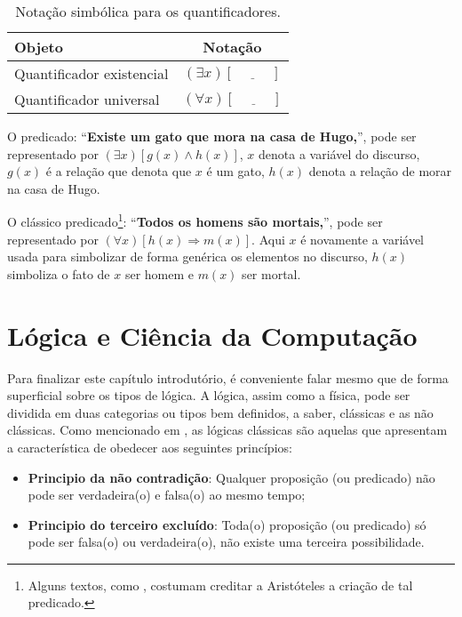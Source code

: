 \begin{table}[h]
	\centering
	\begin{tabular}{lc}
		\hline
		\textbf{Objeto} & \textbf{Notação}\\
		\hline
		Quantificador existencial & $(\exists x)[\underline{ \ \ \ \ \ \ \ \ \ \ \ \ }]$\\
		Quantificador universal & $(\forall x)[\underline{ \ \ \ \ \ \ \ \ \ \ \ \ }]$\\
		\hline
	\end{tabular}
	\caption{Notação simbólica para os quantificadores.}
\end{table}

\begin{exemplo}\label{exe:RepresentacaoSimbolica3}
	O predicado: ``\textbf{Existe um gato que mora na casa de Hugo,}'', pode ser representado por $(\exists x)[g(x) \land h(x)]$, $x$ denota a variável do discurso, $g(x)$ é a relação que denota que $x$ é um gato, $h(x)$ denota a relação de morar na casa de Hugo.
\end{exemplo}

\begin{exemplo}\label{exe:RepresentacaoSimbolica4}
	O clássico predicado\footnote{Alguns textos, como \cite{carmo2013}, costumam creditar a Aristóteles a criação de tal predicado.}: ``\textbf{Todos os homens são mortais,}'', pode ser representado por $(\forall x)[h(x) \Rightarrow m(x)]$. Aqui $x$ é novamente a variável usada para simbolizar de forma genérica os elementos no discurso, $h(x)$ simboliza o fato de $x$ ser homem e $m(x)$ ser mortal.
\end{exemplo}

\section{Lógica e Ciência da Computação}\label{sec:LogicsAndComputation}

Para finalizar este capítulo introdutório, é conveniente falar mesmo que de forma superficial sobre os tipos de lógica. A lógica, assim como a física, pode ser dividida em duas categorias ou tipos bem definidos, a saber, clássicas e as não clássicas. Como mencionado em \cite{benja-Logica, edgar2002}, as lógicas clássicas são aquelas que apresentam a característica de obedecer aos seguintes princípios:

\begin{itemize}
	\item \textbf{Principio da não contradição}: Qualquer proposição (ou predicado) não pode ser verdadeira(o) e falsa(o) ao mesmo tempo;
	\item \textbf{Principio do terceiro excluído}: Toda(o) proposição (ou predicado) só pode ser falsa(o) ou verdadeira(o), não existe uma terceira possibilidade.
\end{itemize}

